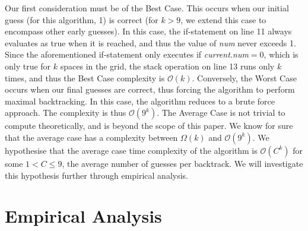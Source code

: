\documentclass[a4paper]{article}
\begin{document}
\newline
Our first consideration must be of the Best Case. This occurs when our initial guess (for this algorithm, 1) is correct (for $k>9$, we extend this case to encompass other early guesses). In this case, the if-statement on line 11 always evaluates as true when it is reached, and thus the value of \textit{num} never exceeds 1. Since the aforementioned if-statement only executes if \textit{current.num}$=0$, which is only true for $k$ spaces in the grid, the stack operation on line 13 runs only $k$ times, and thus the Best Case complexity is $\mathcal{O}(k)$.
\newline
Conversely, the Worst Case occurs when our final guesses are correct, thus forcing the algorithm to perform maximal backtracking. In this case, the algorithm reduces to a brute force approach. The complexity is thus $\mathcal{O}(9^k)$.
\newline
The Average Case is not trivial to compute theoretically, and is beyond the scope of this paper. We know for sure that the average case has a complexity between $\Omega(k)$ and $\mathcal{O}(9^k)$. We hypothesise that the average case time complexity of the algorithm is $\mathcal{O}(C^k)$ for some $1<C\leq 9$, the average number of guesses per backtrack. We will investigate this hypothesis further through empirical analysis.
\section{Empirical Analysis}
\end{document}
